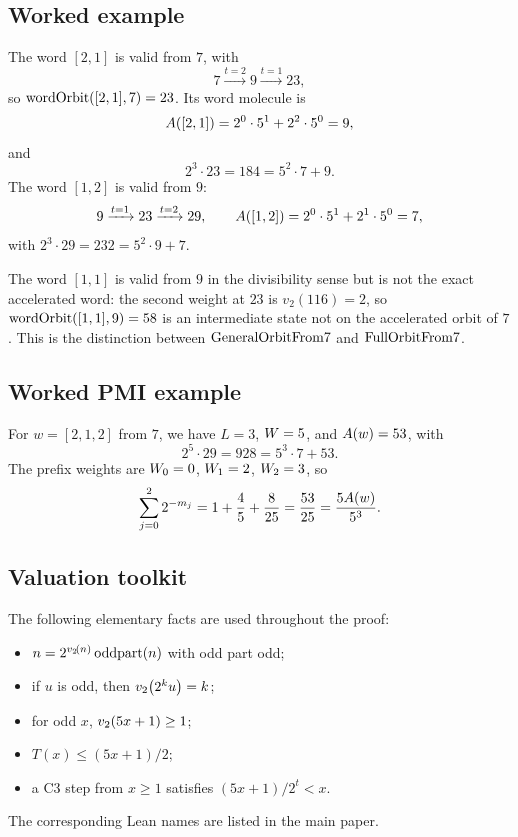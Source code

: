 \subsection{Worked example}

The word $[2,1]$ is valid from $7$, with
\begin{equation*}
  7 \xrightarrow{t=2} 9 \xrightarrow{t=1} 23,
\end{equation*}
so $\mathrm{wordOrbit}([2,1],7)=23$.  Its word molecule is
\begin{equation*}
  A([2,1])=2^0\cdot5^1+2^2\cdot5^0=9,
\end{equation*}
and
\begin{equation*}
  2^3\cdot23=184=5^2\cdot7+9.
\end{equation*}
The word $[1,2]$ is valid from $9$:
\begin{equation*}
  9 \xrightarrow{t=1} 23 \xrightarrow{t=2} 29,
\qquad
  A([1,2])=2^0\cdot5^1+2^1\cdot5^0=7,
\end{equation*}
with $2^3\cdot29=232=5^2\cdot9+7$.

The word $[1,1]$ is valid from $9$ in the divisibility sense but is
not the exact accelerated word: the second weight at $23$ is
$v_2(116)=2$, so $\mathrm{wordOrbit}([1,1],9)=58$ is an intermediate state not
on the accelerated orbit of $7$.  This is the distinction between
$\mathrm{GeneralOrbitFrom7}$ and $\mathrm{FullOrbitFrom7}$.

\subsection{Worked PMI example}

For $w=[2,1,2]$ from $7$, we have $L=3$, $W=5$, and
$A(w)=53$, with
\begin{equation*}
  2^5\cdot29=928=5^3\cdot7+53.
\end{equation*}
The prefix weights are $W_0=0$, $W_1=2$,
$W_2=3$, so
\begin{equation*}
  \sum_{j=0}^{2}2^{-m_j}
    =1+\frac45+\frac8{25}
    =\frac{53}{25}
    =\frac{5A(w)}{5^3}.
\end{equation*}

\subsection{Valuation toolkit}

The following elementary facts are used throughout the proof:
\begin{itemize}[leftmargin=*]
\item $n=2^{v_2\!\left(n\right)}\operatorname{oddpart}(n)$ with odd part odd;
\item if $u$ is odd, then $v_2\!\left(2^k u\right)=k$;
\item for odd $x$, $v_2\!\left(5x+1\right)\ge1$;
\item $T(x)\le(5x+1)/2$;
\item a C3 step from $x\ge1$ satisfies $(5x+1)/2^t<x$.
\end{itemize}
The corresponding Lean names are listed in the main paper.

